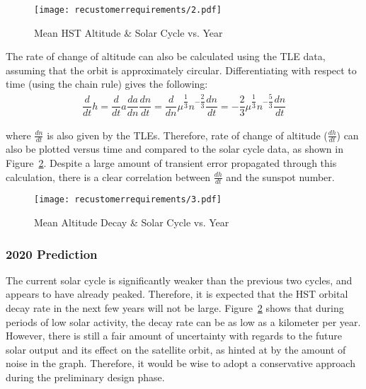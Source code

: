 \documentclass[onecolumn,10pt]{jhwhw}
\begin{document}
\begin{figure}[tb!]
\begin{center}
\texttt{[image: recustomerrequirements/2.pdf]}
\caption{Mean HST Altitude \& Solar Cycle vs. Year}
\label{fig:fig2}
\end{center}
\end{figure}

The rate of change of altitude can also be calculated using the TLE data, assuming that the orbit is approximately circular. Differentiating with respect to time (using the chain rule) gives the following:
\begin{align*}
\dfrac{d}{dt} h = \dfrac{d}{dt} a \dfrac{da}{dn} \dfrac{dn}{dt} = \dfrac{d}{dn} \mu^{\dfrac{1}{3}} n^{-\dfrac{2}{3}} \dfrac{dn}{dt} = -\dfrac{2}{3} \mu^{\dfrac{1}{3}} n^{-\dfrac{5}{3}} \dfrac{dn}{dt}
\end{align*}

where $\frac{dn}{dt}$ is also given by the TLEs. Therefore, rate of change of altitude ($\frac{dh}{dt}$) can also be plotted versus time and compared to the solar cycle data, as shown in Figure~\ref{fig:fig3}. Despite a large amount of transient error propagated through this calculation, there is a clear correlation between $\frac{dh}{dt}$ and the sunspot number.

\begin{figure}[tb!]
\begin{center}
\texttt{[image: recustomerrequirements/3.pdf]}
\caption{Mean Altitude Decay \& Solar Cycle vs. Year}
\label{fig:fig3}
\end{center}
\end{figure}

\subsubsection{2020 Prediction}
The current solar cycle is significantly weaker than the previous two cycles, and appears to have already peaked. Therefore, it is expected that the HST orbital decay rate in the next few years will not be large. Figure~\ref{fig:fig3} shows that during periods of low solar activity, the decay rate can be as low as a kilometer per year. However, there is still a fair amount of uncertainty with regards to the future solar output and its effect on the satellite orbit, as hinted at by the amount of noise in the graph. Therefore, it would be wise to adopt a conservative approach during the preliminary design phase.
\end{document}
